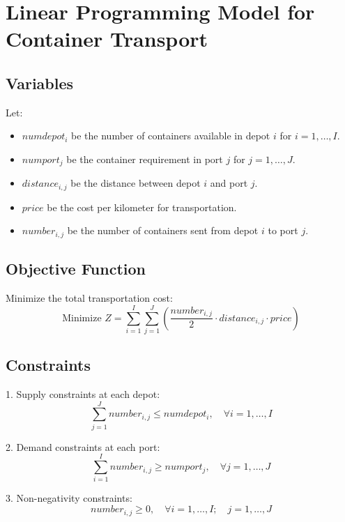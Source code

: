 \documentclass{article}
\begin{document}
\section*{Linear Programming Model for Container Transport}

\subsection*{Variables}
Let:
\begin{itemize}
    \item \( numdepot_i \) be the number of containers available in depot \( i \) for \( i = 1, \ldots, I \).
    \item \( numport_j \) be the container requirement in port \( j \) for \( j = 1, \ldots, J \).
    \item \( distance_{i,j} \) be the distance between depot \( i \) and port \( j \).
    \item \( price \) be the cost per kilometer for transportation.
    \item \( number_{i,j} \) be the number of containers sent from depot \( i \) to port \( j \).
\end{itemize}

\subsection*{Objective Function}
Minimize the total transportation cost:
\[
\text{Minimize } Z = \sum_{i=1}^{I} \sum_{j=1}^{J} \left(\frac{number_{i,j}}{2} \cdot distance_{i,j} \cdot price\right)
\]

\subsection*{Constraints}
1. Supply constraints at each depot:
\[
\sum_{j=1}^{J} number_{i,j} \leq numdepot_i, \quad \forall i = 1, \ldots, I
\]

2. Demand constraints at each port:
\[
\sum_{i=1}^{I} number_{i,j} \geq numport_j, \quad \forall j = 1, \ldots, J
\]

3. Non-negativity constraints:
\[
number_{i,j} \geq 0, \quad \forall i = 1, \ldots, I; \quad j = 1, \ldots, J
\]
\end{document}
